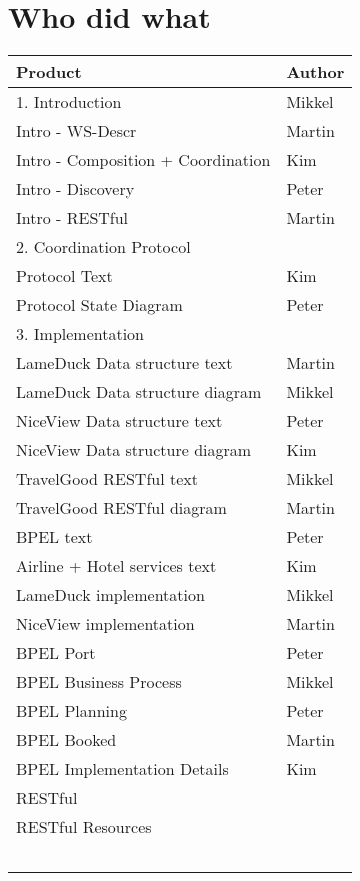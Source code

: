 \chapter{Who did what}

\begin{tabular}{|l|l|}
\hline \textbf{Product} & \textbf{Author} \\ \hline
\hline 1. Introduction & Mikkel \\ 
\hline Intro - WS-Descr & Martin \\ 
\hline Intro - Composition + Coordination & Kim \\ 
\hline Intro - Discovery & Peter  \\ 
\hline Intro - RESTful & Martin  \\ 
\hline 2. Coordination Protocol &  \\ 
\hline Protocol Text & Kim \\ 
\hline Protocol State Diagram & Peter \\ 
\hline 3. Implementation &  \\ 
\hline LameDuck Data structure text & Martin \\ 
\hline LameDuck Data structure diagram & Mikkel \\ 
\hline NiceView Data structure text & Peter  \\ 
\hline NiceView Data structure diagram & Kim \\ 
\hline TravelGood RESTful text & Mikkel \\ 
\hline TravelGood RESTful diagram & Martin  \\ 
\hline BPEL text & Peter \\ 
\hline Airline + Hotel services text & Kim  \\ 
\hline LameDuck implementation & Mikkel \\ 
\hline NiceView implementation & Martin \\ 
\hline BPEL Port & Peter \\ 
\hline BPEL Business Process & Mikkel  \\ 
\hline BPEL Planning & Peter  \\ 
\hline BPEL Booked & Martin \\ 
\hline BPEL Implementation Details & Kim \\ 
\hline RESTful &  \\ 
\hline RESTful Resources &   \\ 
\hline  &  \\ 
\hline  &  \\ 
\hline  &  \\ 
\hline  &  \\ 
\hline  &  \\ 
\hline 
\end{tabular} 



